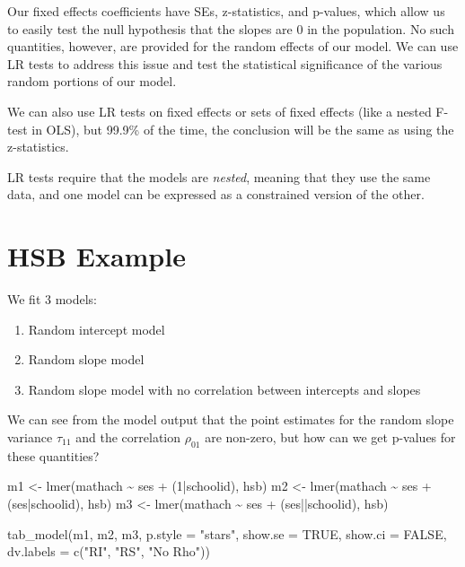 \documentclass[
  letterpaper,
  DIV=11,
  numbers=noendperiod]{scrreprt}
\newenvironment{Shaded}{}{}
\newcommand{\AttributeTok}[1]{\textcolor[rgb]{0.49,0.56,0.16}{#1}}
\newcommand{\ConstantTok}[1]{\textcolor[rgb]{0.53,0.00,0.00}{#1}}
\newcommand{\DecValTok}[1]{\textcolor[rgb]{0.25,0.63,0.44}{#1}}
\newcommand{\FunctionTok}[1]{\textcolor[rgb]{0.02,0.16,0.49}{#1}}
\newcommand{\NormalTok}[1]{#1}
\newcommand{\OtherTok}[1]{\textcolor[rgb]{0.00,0.44,0.13}{#1}}
\newcommand{\SpecialCharTok}[1]{\textcolor[rgb]{0.25,0.44,0.63}{#1}}
\newcommand{\StringTok}[1]{\textcolor[rgb]{0.25,0.44,0.63}{#1}}
\providecommand{\tightlist}{%
  \setlength{\itemsep}{0pt}\setlength{\parskip}{0pt}}\usepackage{longtable,booktabs,array}
\begin{document}
Our fixed effects coefficients have SEs, z-statistics, and p-values,
which allow us to easily test the null hypothesis that the slopes are 0
in the population. No such quantities, however, are provided for the
random effects of our model. We can use LR tests to address this issue
and test the statistical significance of the various random portions of
our model.

We can also use LR tests on fixed effects or sets of fixed effects (like
a nested F-test in OLS), but 99.9\% of the time, the conclusion will be
the same as using the z-statistics.

LR tests require that the models are \emph{nested}, meaning that they
use the same data, and one model can be expressed as a constrained
version of the other.

\section{HSB Example}\label{hsb-example}

We fit 3 models:

\begin{enumerate}
\def\labelenumi{\arabic{enumi}.}
\tightlist
\item
  Random intercept model
\item
  Random slope model
\item
  Random slope model with no correlation between intercepts and slopes
\end{enumerate}

We can see from the model output that the point estimates for the random
slope variance \(\tau_{11}\) and the correlation \(\rho_{01}\) are
non-zero, but how can we get p-values for these quantities?

\begin{Shaded}
\begin{Highlighting}[]
\NormalTok{m1 }\OtherTok{\textless{}{-}} \FunctionTok{lmer}\NormalTok{(mathach }\SpecialCharTok{\textasciitilde{}}\NormalTok{ ses }\SpecialCharTok{+}\NormalTok{ (}\DecValTok{1}\SpecialCharTok{|}\NormalTok{schoolid), hsb)}
\NormalTok{m2 }\OtherTok{\textless{}{-}} \FunctionTok{lmer}\NormalTok{(mathach }\SpecialCharTok{\textasciitilde{}}\NormalTok{ ses }\SpecialCharTok{+}\NormalTok{ (ses}\SpecialCharTok{|}\NormalTok{schoolid), hsb)}
\NormalTok{m3 }\OtherTok{\textless{}{-}} \FunctionTok{lmer}\NormalTok{(mathach }\SpecialCharTok{\textasciitilde{}}\NormalTok{ ses }\SpecialCharTok{+}\NormalTok{ (ses}\SpecialCharTok{||}\NormalTok{schoolid), hsb)}

\FunctionTok{tab\_model}\NormalTok{(m1, m2, m3,}
          \AttributeTok{p.style =} \StringTok{"stars"}\NormalTok{,}
          \AttributeTok{show.se =} \ConstantTok{TRUE}\NormalTok{,}
          \AttributeTok{show.ci =} \ConstantTok{FALSE}\NormalTok{,}
          \AttributeTok{dv.labels =} \FunctionTok{c}\NormalTok{(}\StringTok{"RI"}\NormalTok{, }\StringTok{"RS"}\NormalTok{, }\StringTok{"No Rho"}\NormalTok{))}
\end{Highlighting}
\end{Shaded}
\end{document}
